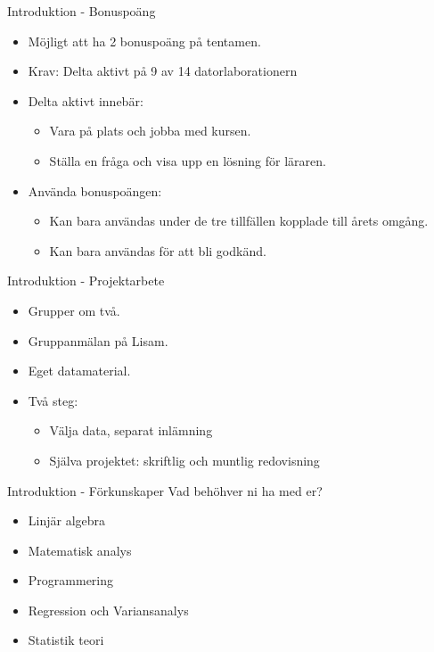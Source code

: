 \documentclass[10pt,english]{beamer}
\begin{document}
\begin{frame}{Introduktion - Bonuspoäng}
    \begin{itemize}
        \item Möjligt att ha 2 bonuspoäng på tentamen.
        \item Krav: Delta aktivt på 9 av 14 datorlaborationern 
        \item Delta aktivt innebär:
        \begin{itemize}
            \item Vara på plats och jobba med kursen.
            \item Ställa en fråga och visa upp en lösning för läraren.
        \end{itemize}
        \item Använda bonuspoängen:
        \begin{itemize}
            \item Kan bara användas under de tre tillfällen kopplade till årets omgång.
            \item Kan bara användas för att bli godkänd.
        \end{itemize}
    \end{itemize}
\end{frame}

\begin{frame}{Introduktion - Projektarbete}
    \begin{itemize}
        \item Grupper om två.
        \item Gruppanmälan på Lisam.
        \item Eget datamaterial.
        \item Två steg:
          \begin{itemize}
            \item Välja data, separat inlämning
            \item Själva projektet: skriftlig och muntlig redovisning
          \end{itemize}
    \end{itemize}
\end{frame}

\begin{frame}{Introduktion - Förkunskaper}
    Vad behöhver ni ha med er?
    \begin{itemize}
        \item Linjär algebra
        \item Matematisk analys
        \item Programmering
        \item Regression och Variansanalys
        \item Statistik teori
    \end{itemize}
\end{frame}
\end{document}
